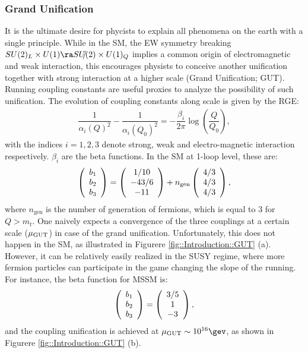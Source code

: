 \subsubsection{Grand Unification}
It is the ultimate desire for phycists to explain all phenomena on the earth with a single principle. 
While in the SM, the EW symmetry breaking $SU(2)_L \times U(1) \ra \slashed{SU(2)} \times U(1)_Q$ implies a common origin of electromagnetic and weak interaction, this encourages physists to conceive another unification together with strong interaction at a higher scale (Grand Unification; GUT). \\

Running coupling constants are useful proxies to analyze the possibility of such unification.
The evolution of coupling constants along scale is given by the RGE:
\begin{align}
\dfrac{1}{\alpha_i(Q)^2}-\dfrac{1}{\alpha_i(Q_0)^2} = -\dfrac{\beta_i}{2\pi} \log{\left(\dfrac{Q}{Q_0}\right)},
\end{align}
with the indices $i=1,2,3$ denote strong, weak and electro-magnetic interaction respectively.
$\beta_i$ are the beta functions. In the SM at 1-loop level, these are:
\begin{align}
\left( \begin{array}{c} b_1 \\ b_2 \\ b_3 \end{array} \right) = \left( \begin{array}{c}  1/10 \\ -43/6 \\ -11 \end{array} \right) + n_{\mathrm{gen}} \left( \begin{array}{c} 4/3 \\ 4/3 \\ 4/3 \end{array} \right),
\end{align}
where $n_{\mathrm{gen}}$ is the number of generation of fermions, which is equal to $3$ for $Q>m_t$.
One naively expects a convergence of the three couplings at a certain scale ($\mu_{\mathrm{GUT}}$) in case of the grand unification.
Unfortunately, this does not happen in the SM, as illustrated in Figurere \ref{fig::Introduction::GUT} (a).
However, it can be relatively easily realized in the SUSY regime, where more fermion particles can participate in the game changing the slope of the running. For instance, the beta function for MSSM is:
\begin{align}
\left( \begin{array}{c} b_1 \\ b_2 \\ b_3 \end{array} \right) = \left( \begin{array}{c} 3/5 \\ 1 \\ -3 \end{array} \right),
\end{align}
and the coupling unification is achieved at $\mu_{\mGUT} \sim 10^{16}\gev$, as shown in Figurere \ref{fig::Introduction::GUT} (b). \\


